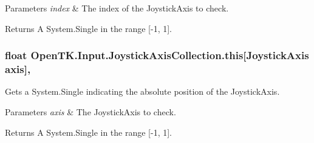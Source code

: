 \begin{DoxyParams}{Parameters}
{\em index} & The index of the Joystick\-Axis to check.\\
\hline
\end{DoxyParams}
\begin{DoxyReturn}{Returns}
A System.\-Single in the range \mbox{[}-\/1, 1\mbox{]}.
\end{DoxyReturn}
\hypertarget{class_open_t_k_1_1_input_1_1_joystick_axis_collection_ab3bdbbfa5eb3a1fa18f3acefbc638247}{
\subsubsection[{this[Joystick\-Axis axis]}]{\setlength{\rightskip}{0pt plus 5cm}float Open\-T\-K.\-Input.\-Joystick\-Axis\-Collection.\-this\mbox{[}{\bf Joystick\-Axis} axis\mbox{]}\hspace{0.3cm}{\ttfamily [get]}, {\ttfamily [set]}}}\label{class_open_t_k_1_1_input_1_1_joystick_axis_collection_ab3bdbbfa5eb3a1fa18f3acefbc638247}


Gets a System.\-Single indicating the absolute position of the Joystick\-Axis. 


\begin{DoxyParams}{Parameters}
{\em axis} & The Joystick\-Axis to check.\\
\hline
\end{DoxyParams}
\begin{DoxyReturn}{Returns}
A System.\-Single in the range \mbox{[}-\/1, 1\mbox{]}.
\end{DoxyReturn}
